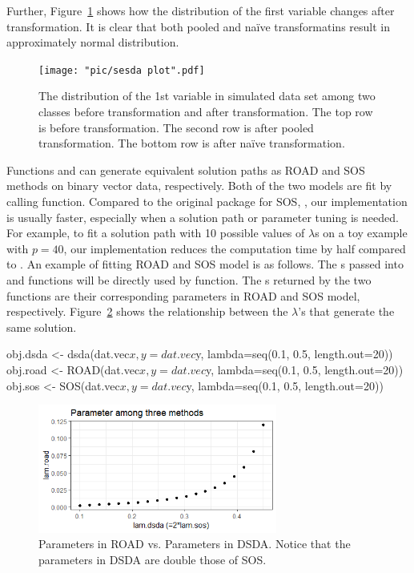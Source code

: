   Further, Figure~\ref{fig:sesda} shows how the distribution of the first variable changes after transformation. It is clear that both pooled and na\"{i}ve transformatins result in approximately normal distribution.
  
  
  \begin{figure}[!t]
  \centering
  \texttt{[image: "pic/sesda plot".pdf]}
  \caption{The distribution of the 1st variable in simulated data set among two classes before transformation and after transformation. The top row is before transformation. The second row is after pooled transformation. The bottom row is after na\"{i}ve transformation.}
  \label{fig:sesda}
  \end{figure}  
  
  
  
  
  Functions  and  can generate equivalent solution paths as ROAD \citep{ROAD} and SOS \citep{Clemmensen} methods on binary vector data, respectively. Both of the two models are fit by calling  function. Compared to the original package for SOS, , our implementation is usually faster, especially when a solution path or parameter tuning is needed. For example, to fit a solution path with 10 possible values of $\lambda$s on a toy example with $p=40$, our implementation reduces the computation time by half compared to . An example of fitting ROAD and SOS model is as follows. The s passed into  and  functions will be directly used by  function. The s returned by the two functions are their corresponding parameters in ROAD and SOS model, respectively. Figure~\ref{fig:param} shows the relationship between the $\lambda$'s that generate the same solution.
  
  
\begin{example}
obj.dsda <- dsda(dat.vec$x, y=dat.vec$y, lambda=seq(0.1, 0.5, length.out=20))
obj.road <- ROAD(dat.vec$x, y=dat.vec$y, lambda=seq(0.1, 0.5, length.out=20))
obj.sos <- SOS(dat.vec$x, y=dat.vec$y, lambda=seq(0.1, 0.5, length.out=20))
\end{example}  
  
  
  
  \begin{figure}[!t]
  \centering
  \includegraphics[width=0.7\textwidth]{pic/param.png}
  \caption{Parameters in ROAD vs. Parameters in DSDA. Notice that the parameters in DSDA are double those of SOS.}
  \label{fig:param}
  \end{figure}
  
